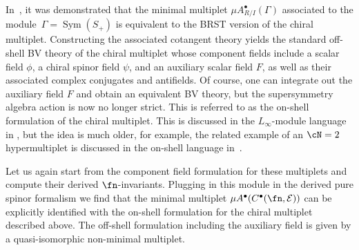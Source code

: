 \documentclass[10pt,a4paper]{amsart}
\numberwithin{equation}{section}
\def\cE{\mathcal E}\def\cF{\mathcal F}\def\cG{\mathcal G}\def\cH{\mathcal H}
\DeclareMathOperator{\Sym}{Sym}
\begin{document}
In~\cite{perspectives}, it was demonstrated that the minimal multiplet $\mu A^\bullet_{R/I}(\Gamma)$ associated to the module~$\Gamma = \Sym(S_+)$ is equivalent to the BRST version of the chiral multiplet. Constructing the associated cotangent theory yields the standard off-shell BV theory of the chiral multiplet whose component fields include a scalar field $\phi$, a chiral spinor field $\psi$, and an auxiliary scalar field $F$, as well as their associated complex conjugates and antifields. Of course, one can integrate out the auxiliary field $F$ and obtain an equivalent BV theory, but the supersymmetry algebra action is now no longer strict. This is referred to as the on-shell formulation of the chiral multiplet. This is discussed in the $L_\infty$-module language in \cite{SWchar}, but the idea is much older, for example, the related example of an $\cN=2$ hypermultiplet is discussed in the on-shell language in~\cite{BaulieuSusy}.

Let us again start from the component field formulation for these multiplets and compute their derived $\fn$-invariants. Plugging in this module in the derived pure spinor formalism we find that the minimal multiplet $\mu A^\bullet(C^\bullet(\fn,\cE))$ can be explicitly identified with the on-shell formulation for the chiral multiplet described above. The off-shell formulation including the auxiliary field is given by a quasi-isomorphic non-minimal multiplet.
\end{document}

